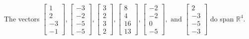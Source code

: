 \begin{exercise}
\begin{exerciseStatement}
  \end{exerciseStatement}
  \begin{exerciseAnswer}
   The vectors \(\left[\begin{array}{r}
1 \\
2 \\
-3 \\
-1
\end{array}\right] , \left[\begin{array}{r}
-3 \\
-2 \\
-5 \\
-5
\end{array}\right] , \left[\begin{array}{r}
3 \\
2 \\
3 \\
2
\end{array}\right] , \left[\begin{array}{r}
8 \\
4 \\
16 \\
13
\end{array}\right] , \left[\begin{array}{r}
-2 \\
-2 \\
0 \\
-5
\end{array}\right] , \text{ and } \left[\begin{array}{r}
2 \\
-3 \\
-5 \\
-3
\end{array}\right]\) 
  	 do  
	span \(\mathbb{R}^4\).
  


  \end{exerciseAnswer}
\end{exercise}